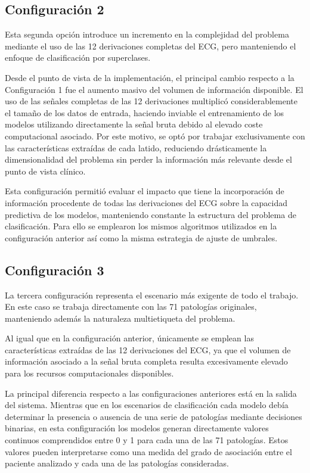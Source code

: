\documentclass[12pt,a4paper,twoside]{book}
\begin{document}
\subsection{Configuración 2}
Esta segunda opción introduce un incremento en la complejidad del problema mediante el uso de las 12 derivaciones completas del ECG, pero manteniendo el enfoque de clasificación por superclases.

Desde el punto de vista de la implementación, el principal cambio respecto a la Configuración 1 fue el aumento masivo del volumen de información disponible. El uso de las señales completas de las 12 derivaciones multiplicó considerablemente el tamaño de los datos de entrada, haciendo inviable el entrenamiento de los modelos utilizando directamente la señal bruta debido al elevado coste computacional asociado. 
Por este motivo, se optó por trabajar exclusivamente con las características extraídas de cada latido, reduciendo drásticamente la dimensionalidad del problema sin perder la información más relevante desde el punto de vista clínico.

Esta configuración permitió evaluar el impacto que tiene la incorporación de información procedente de todas las derivaciones del ECG sobre la capacidad predictiva de los modelos, manteniendo constante la estructura del problema de clasificación. 
Para ello se emplearon los mismos algoritmos utilizados en la configuración anterior así como la misma estrategia de ajuste de umbrales.

\subsection{Configuración 3}

La tercera configuración representa el escenario más exigente de todo el trabajo. En este caso se trabaja directamente con las 71 patologías originales, manteniendo además la naturaleza multietiqueta del problema.

Al igual que en la configuración anterior, únicamente se emplean las características extraídas de las 12 derivaciones del ECG, ya que el volumen de información asociado a la señal bruta completa resulta excesivamente elevado para los recursos computacionales disponibles.

La principal diferencia respecto a las configuraciones anteriores está en la salida del sistema. 
Mientras que en los escenarios de clasificación cada modelo debía determinar la presencia o ausencia de una serie de patologías mediante decisiones binarias, en esta configuración los modelos generan directamente valores continuos comprendidos entre 0 y 1 para cada una de las 71 patologías. 
Estos valores pueden interpretarse como una medida del grado de asociación entre el paciente analizado y cada una de las patologías consideradas.
\end{document}
